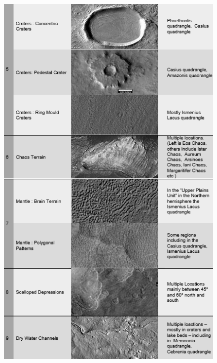 \documentclass[project-plan]{report-template}
\begin{document}
\begin{figure}[htp]
    \begin{center}
        \includegraphics[width=1\textwidth]{table-1-part-2.png}
    \end{center}
\end{figure}
\end{document}
